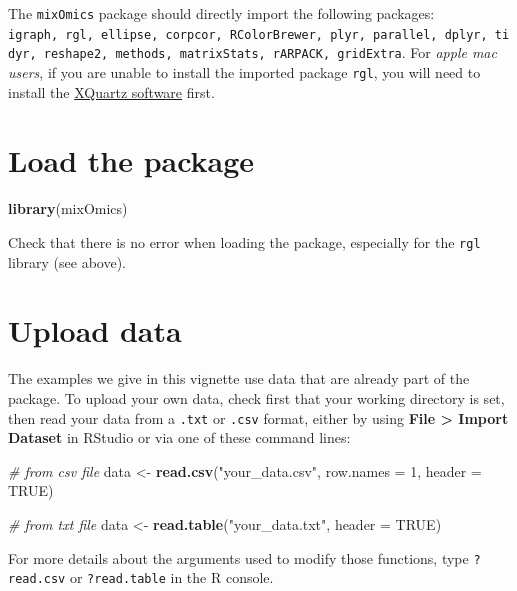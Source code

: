 \documentclass[]{book}
\newenvironment{Shaded}{\begin{snugshade}}{\end{snugshade}}
\newcommand{\CommentTok}[1]{\textcolor[rgb]{0.56,0.35,0.01}{\textit{#1}}}
\newcommand{\DataTypeTok}[1]{\textcolor[rgb]{0.13,0.29,0.53}{#1}}
\newcommand{\DecValTok}[1]{\textcolor[rgb]{0.00,0.00,0.81}{#1}}
\newcommand{\KeywordTok}[1]{\textcolor[rgb]{0.13,0.29,0.53}{\textbf{#1}}}
\newcommand{\NormalTok}[1]{#1}
\newcommand{\OtherTok}[1]{\textcolor[rgb]{0.56,0.35,0.01}{#1}}
\newcommand{\StringTok}[1]{\textcolor[rgb]{0.31,0.60,0.02}{#1}}
\begin{document}
The \texttt{mixOmics} package should directly import the following packages: \texttt{igraph,\ rgl,\ ellipse,\ corpcor,\ RColorBrewer,\ plyr,\ parallel,\ dplyr,\ tidyr,\ reshape2,\ methods,\ matrixStats,\ rARPACK,\ gridExtra}. For \emph{apple mac users}, if you are unable to install the imported package \texttt{rgl}, you will need to install the \href{https://www.xquartz.org}{XQuartz software} first.

\hypertarget{start:upload}{%
\section{Load the package}\label{start:upload}}

\begin{Shaded}
\begin{Highlighting}[]
\KeywordTok{library}\NormalTok{(mixOmics)}
\end{Highlighting}
\end{Shaded}

Check that there is no error when loading the package, especially for the \texttt{rgl} library (see above).

\hypertarget{upload-data}{%
\section{Upload data}\label{upload-data}}

The examples we give in this vignette use data that are already part of the package. To upload your own data, check first that your working directory is set, then read your data from a \texttt{.txt} or \texttt{.csv} format, either by using \textbf{File \textgreater{} Import Dataset} in RStudio or via one of these command lines:

\begin{Shaded}
\begin{Highlighting}[]
\CommentTok{# from csv file}
\NormalTok{data <-}\StringTok{ }\KeywordTok{read.csv}\NormalTok{(}\StringTok{"your_data.csv"}\NormalTok{, }\DataTypeTok{row.names =} \DecValTok{1}\NormalTok{, }\DataTypeTok{header =} \OtherTok{TRUE}\NormalTok{)}

\CommentTok{# from txt file}
\NormalTok{data <-}\StringTok{ }\KeywordTok{read.table}\NormalTok{(}\StringTok{"your_data.txt"}\NormalTok{, }\DataTypeTok{header =} \OtherTok{TRUE}\NormalTok{)}
\end{Highlighting}
\end{Shaded}

For more details about the arguments used to modify those functions, type \texttt{?read.csv} or \texttt{?read.table} in the R console.
\end{document}
